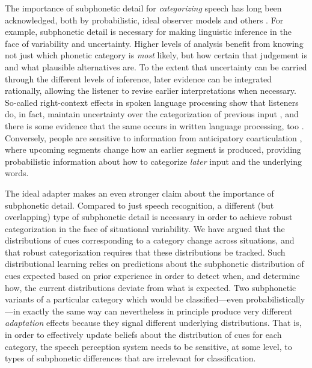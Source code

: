 \label{r3-subphonetic-classification}
The importance of subphonetic detail for \emph{categorizing} speech has long been acknowledged, both by probabilistic, ideal observer models \cite{Clayards2008,Feldman2009a,Norris2008,Sonderegger2010} and others \cite{McClelland1986,Norris1994,Norris2000}.  For example, subphonetic detail is necessary for making linguistic inference in the face of variability and uncertainty.  Higher levels of analysis benefit from knowing not just which phonetic category is \emph{most} likely, but how certain that judgement is and what plausible alternatives are.  To the extent that uncertainty can be carried through the different levels of inference, later evidence can be integrated rationally, allowing the listener to revise earlier interpretations when necessary.
So-called right-context effects in spoken language processing show that listeners do, in fact, maintain uncertainty over the categorization of previous input \cite{Bard1988,Connine1991,Dahan2010,Grosjean1985}, and there is some evidence that the same occurs in written language processing, too \cite{Levy2009}.  Conversely, people are sensitive to information from anticipatory coarticulation \cite{Dahan2001a,Marslen-Wilson1994a,McQueen1999,Whalen1984}, where upcoming segments change how an earlier segment is produced, providing probabilistic information about how to categorize \emph{later} input and the underlying words.  

\label{r3-subphon-beyond-class}
The ideal adapter makes an even stronger claim about the importance of subphonetic detail.  Compared to just speech recognition, a different (but overlapping) type of subphonetic detail is necessary in order to achieve robust categorization in the face of situational variability.  We have argued that the distributions of cues corresponding to a category change across situations, and that robust categorization requires that these distributions be tracked.  Such distributional learning relies on predictions about the subphonetic distribution of cues expected based on prior experience in order to detect when, and determine how, the current distributions deviate from what is expected.
Two subphonetic variants of a particular category which would be classified---even probabilistically---in exactly the same way can nevertheless in principle produce very different \emph{adaptation} effects because they signal different underlying distributions.  That is, in order to effectively update beliefs about the distribution of cues for each category, the speech perception system needs to be sensitive, at some level, to types of subphonetic differences that are irrelevant for classification.

